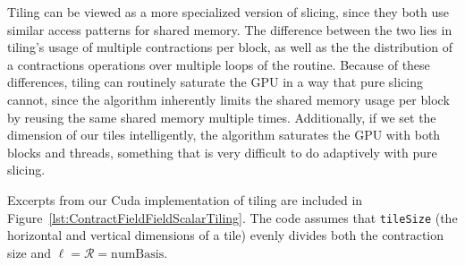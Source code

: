    Tiling can be viewed as a more specialized version of slicing, since they
both use similar access patterns for shared memory. The difference between the
two lies in tiling's usage of multiple contractions per block, as well as the
the distribution of a contractions operations over multiple loops of the
routine. Because of these differences, tiling can routinely saturate the GPU in
a way that pure slicing cannot, since the algorithm inherently limits the
shared memory usage per block by reusing the same shared memory multiple times.
Additionally, if we set the dimension of our tiles intelligently, the algorithm
saturates the GPU with both blocks and threads, something that is very
difficult to do adaptively with pure slicing. 
	
    Excerpts from our Cuda implementation of tiling are included in Figure~\ref{lst:ContractFieldFieldScalarTiling}. The
code assumes that \texttt{tileSize} (the horizontal and vertical dimensions of a tile)
evenly divides both the contraction size and $\ell = \mathcal{R} =
\text{numBasis}$.
	
